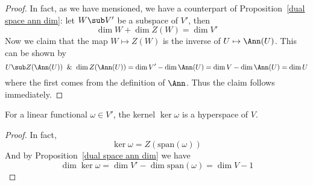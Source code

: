 \begin{proof}
In fact, as we have mensioned, we have a counterpart of Proposition~\ref{dual space ann dim}: let $W\sub V'$ be a subspace of $V'$, then
\[\dim W+\dim Z(W)=\dim V'\]
Now we claim that the map $W\mapsto Z(W)$ is the inverse of $U\mapsto\Ann(U)$. This can be shown by
\[U\sub Z(\Ann(U))\And \dim Z(\Ann(U))=\dim V'-\dim\Ann(U)=\dim V-\dim\Ann(U)=\dim U\]
where the first comes from the definition of $\Ann$. Thus the claim follows immediately.
\end{proof}
\begin{corollary}
For a linear functional $\omega\in V'$, the kernel $\ker\omega$ is a hyperspace of $V$.
\end{corollary}
\begin{proof}
In fact,
\[\ker\omega=Z(\mathrm{span}(\omega))\]
And by Proposition~\ref{dual space ann dim} we have
\[\dim\ker\omega=\dim V'-\dim\mathrm{span}(\omega)=\dim V-1\]
\end{proof}